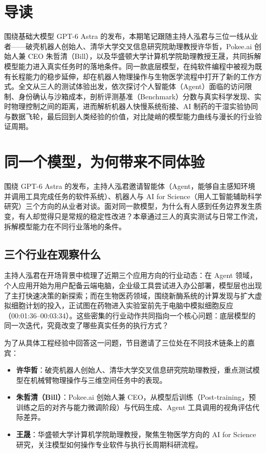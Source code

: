 \documentclass[UTF8,a4paper,11pt,fontset=fandol]{ctexart}
\begin{document}
\section*{导读}
围绕基础大模型 GPT-6 Astra 的发布，本期笔记跟随主持人泓君与三位一线从业者——破壳机器人创始人、清华大学交叉信息研究院助理教授许华哲，Pokee.ai 创始人兼 CEO 朱哲清（Bill），以及华盛顿大学计算机学院助理教授王晟，共同拆解模型能力进入真实任务时的落地条件。同一款底层模型，在纯软件编程中被视为既有长程能力的稳步延伸，却在机器人物理操作与生物医学流程中打开了新的工作方式。全文从三人的测试体验出发，依次探讨个人智能体（Agent）面临的访问限制、身份确认与沙箱成本，剖析评测基准（Benchmark）分数与真实科学发现、实时物理控制之间的距离，进而解析机器人快慢系统衔接、AI 制药的干湿实验协同与数据飞轮，最后回到人类经验的价值，对比陡峭的模型能力曲线与漫长的行业验证周期。
\section{同一个模型，为何带来不同体验}
围绕 GPT-6 Astra 的发布，主持人泓君邀请智能体（Agent，能够自主感知环境并调用工具完成任务的软件系统）、机器人与 AI for Science（用人工智能辅助科学研究）三个方向的从业者对谈。面对同一款模型，为什么有人感到任务边界发生质变，有人却觉得只是常规的稳定性改进？本章通过三人的真实测试与日常工作流，拆解模型能力在不同行业落地的条件。
\subsection{三个行业在观察什么}
主持人泓君在开场背景中梳理了近期三个应用方向的行业动态：在 Agent 领域，个人应用开始为用户配备云端电脑，企业级工具尝试进入办公部署，模型层也出现了主打快速决策的新探索；而在生物医药领域，围绕新酶系统的计算发现与扩大虚拟细胞计划的投入，正试图在药物进入实验室前先于电脑中模拟细胞反应（00:01:36–00:03:34）。这些密集的行业动作共同指向一个核心问题：底层模型的同一次迭代，究竟改变了哪些真实任务的执行方式？

为了从具体工程经验中回答这一问题，节目邀请了三位处在不同技术链条上的嘉宾：

\begin{itemize}
\item \textbf{许华哲}：破壳机器人创始人、清华大学交叉信息研究院助理教授，重点测试模型在机械臂物理操作与三维空间任务中的表现。
\item \textbf{朱哲清（Bill）}：Pokee.ai 创始人兼 CEO，从模型后训练（Post-training，预训练之后的对齐与能力微调阶段）与代码生成、Agent 工具调用的视角评估代际差异。
\item \textbf{王晟}：华盛顿大学计算机学院助理教授，聚焦生物医学方向的 AI for Science 研究，关注模型如何操作专业软件与执行长周期科研流程。
\end{itemize}
\end{document}
